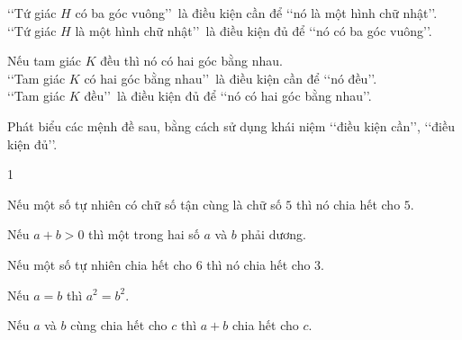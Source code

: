 \begin{bt}
{\begin{listEX}
			\lq\lq Tứ giác $H$ có ba  góc vuông\rq\rq\ là điều kiện cần để \lq\lq nó là một hình chữ nhật\rq\rq.\\
			\lq\lq Tứ giác $H$ là một hình chữ nhật\rq\rq\ là điều kiện đủ để \lq\lq nó có ba góc  vuông\rq\rq.
			\item  Nếu tam giác $K$ đều thì nó có hai góc bằng nhau.\\
			\lq\lq Tam giác $K$ có hai góc bằng nhau\rq\rq\ là điều kiện cần  để \lq\lq nó đều\rq\rq.\\
			\lq\lq Tam giác $K$ đều\rq\rq\ là điều kiện đủ để \lq\lq nó  có hai góc bằng nhau\rq\rq.
		\end{listEX}
	} 
\end{bt}

\begin{bt}%
	Phát biểu các mệnh đề sau, bằng cách sử dụng khái niệm \lq\lq điều kiện  cần\rq\rq, \lq\lq điều kiện đủ\rq\rq.
	\begin{enumEX}{1}
		\item Nếu một số tự nhiên có chữ số tận cùng là chữ số $5$ thì nó chia hết cho  $5$.
		\item Nếu $a+b>0$ thì một trong hai số $a$  và $b$ phải dương.
		\item Nếu một số tự nhiên chia hết cho $6$ thì  nó chia hết cho $3$.
		\item Nếu $a=b$  thì $a^2=b^2$.
		\item Nếu $a$ và $b$ cùng chia hết  cho $c$ thì $a+b$ chia hết cho $c$.
	\end{enumEX}
\end{bt}
